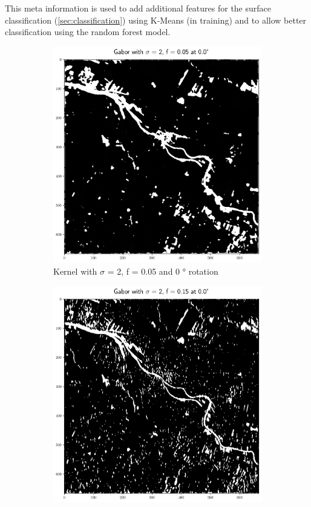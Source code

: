 \documentclass[12pt,a4paper, english]{article}
\begin{document}
    This meta information is used to add additional features for the surface classification (\cref{sec:classification}) using K-Means (in training) and to allow better classification using the random forest model.
%
    \begin{figure}[!htbp]
       \centering
     \begin{subfigure}[b]{0.45\textwidth}
         \centering
         \includegraphics[width=\textwidth]{img/Features_2_005_0.png}
         \caption{Kernel with $\sigma$ = 2, f = 0.05 and 0 ° rotation}\label{fig:feat01}
     \end{subfigure}
     \hfill
     \begin{subfigure}[b]{0.45\textwidth}
         \centering
         \includegraphics[width=\textwidth]{img/Features_2_015_0.png}

\end{subfigure}
\end{figure}
\end{document}
